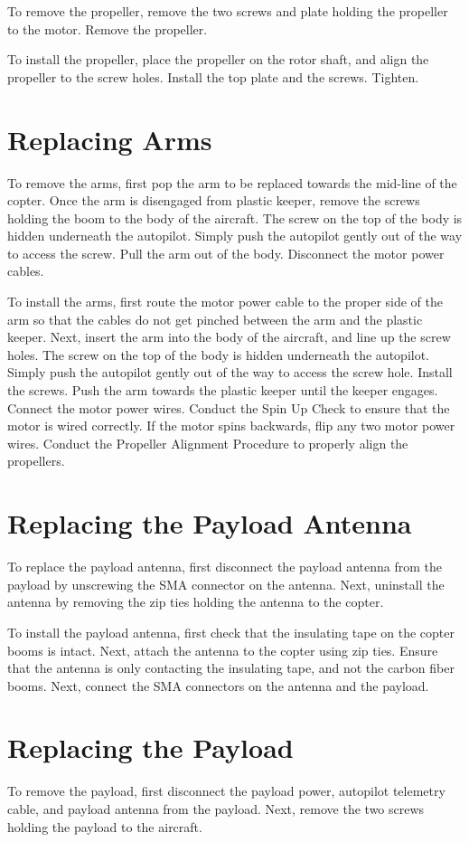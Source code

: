 \documentclass{report}
\begin{document}
		To remove the propeller, remove the two screws and plate holding the propeller to the motor.  Remove the propeller.

		To install the propeller, place the propeller on the rotor shaft, and align the propeller to the screw holes.  Install the top plate and the screws.  Tighten.
	\section{Replacing Arms}
		To remove the arms, first pop the arm to be replaced towards the mid-line of the copter.  Once the arm is disengaged from plastic keeper, remove the screws holding the boom to the body of the aircraft.  The screw on the top of the body is hidden underneath the autopilot.  Simply push the autopilot gently out of the way to access the screw.  Pull the arm out of the body.  Disconnect the motor power cables.

		To install the arms, first route the motor power cable to the proper side of the arm so that the cables do not get pinched between the arm and the plastic keeper.  Next, insert the arm into the body of the aircraft, and line up the screw holes.  The screw on the top of the body is hidden underneath the autopilot.  Simply push the autopilot gently out of the way to access the screw hole.  Install the screws.  Push the arm towards the plastic keeper until the keeper engages.  Connect the motor power wires.  Conduct the Spin Up Check to ensure that the motor is wired correctly.  If the motor spins backwards, flip any two motor power wires.  Conduct the Propeller Alignment Procedure to properly align the propellers.
	\section{Replacing the Payload Antenna}
		To replace the payload antenna, first disconnect the payload antenna from the payload by unscrewing the SMA connector on the antenna.  Next, uninstall the antenna by removing the zip ties holding the antenna to the copter.

		To install the payload antenna, first check that the insulating tape on the copter booms is intact.  Next, attach the antenna to the copter using zip ties.  Ensure that the antenna is only contacting the insulating tape, and not the carbon fiber booms.  Next, connect the SMA connectors on the antenna and the payload.
	\section{Replacing the Payload}
		To remove the payload, first disconnect the payload power, autopilot telemetry cable, and payload antenna from the payload.  Next, remove the two screws holding the payload to the aircraft.
\end{document}
